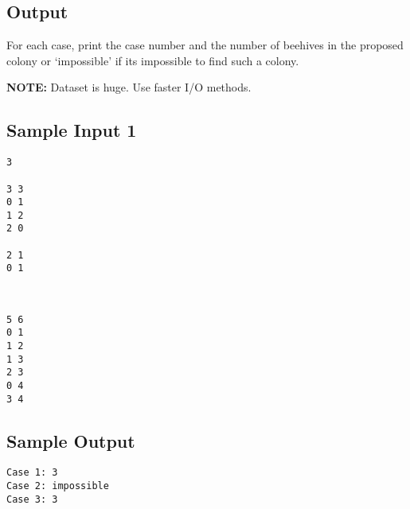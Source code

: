 \subsection*{Output}

For each case, print the case number and the number of beehives in the proposed colony or `impossible' if its impossible to find such a colony.\bigskip

\textbf{NOTE:} Dataset is huge. Use faster I/O methods.
\bigskip

\begin{multicols}{3}
\subsection*{Sample Input 1}

\begin{verbatim}
3

3 3
0 1
1 2
2 0

2 1
0 1
\end{verbatim}
\columnbreak
~\vspace{1cm}

\begin{verbatim}
5 6
0 1
1 2
1 3
2 3
0 4
3 4
\end{verbatim}
\columnbreak
\subsection*{Sample Output}

\begin{verbatim}
Case 1: 3
Case 2: impossible
Case 3: 3
\end{verbatim}
\end{multicols}